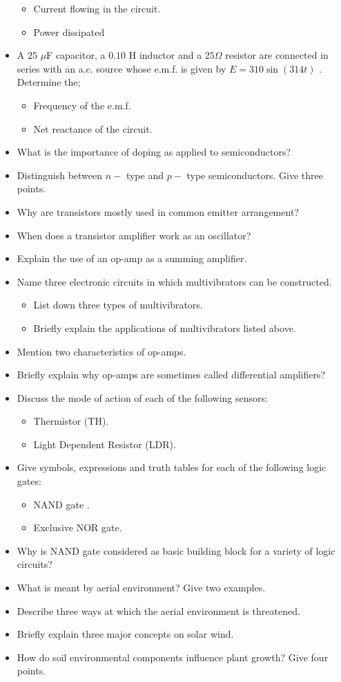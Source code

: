 \documentclass{article}
\begin{document}
\begin{itemize}
 \begin{itemize}
\item Current flowing in the circuit.
\item Power dissipated
\end{itemize}
\item A $ 25$ $\mu$F capacitor, a $ 0.10$ H inductor and a $ 25\Omega $ resistor are connected in series with an a.c. source whose e.m.f. is given by $ E=310 \sin(314t)$ .  Determine the;
 \begin{itemize}
\item Frequency of the e.m.f.
\item Net reactance of the circuit.
\end{itemize}
\item What is the importance of doping as applied to semiconductors?
\item Distinguish between $ n-$ type and $ p-$ type semiconductors.  Give three points.
\item Why are transistors mostly used in common emitter arrangement?
\item When does a transistor amplifier work as an oscillator?
\item Explain the use of an op-amp as a summing amplifier.
\item Name three electronic circuits in which multivibrators can be constructed.
 \begin{itemize}
\item List down three types of multivibrators.
\item Briefly explain the applications of multivibrators listed above.
\end{itemize}
\item Mention two characteristics of op-amps.
\item Briefly explain why op-amps are sometimes called differential amplifiers?
\item Discuss the mode of action of each of the following sensors:
 \begin{itemize}
\item Thermistor (TH).
\item Light Dependent Resistor (LDR).
\end{itemize}
\item Give symbols, expressions and truth tables for each of the following logic gates: 
 \begin{itemize}
\item NAND gate .
\item Exclusive NOR gate.
\end{itemize}
\item Why is NAND gate considered as basic building block for a variety of logic circuits?
\item What is meant by aerial environment?  Give two examples.
\item Describe three ways at which the aerial environment is threatened.
\item Briefly explain three major concepts on solar wind.
\item How do soil environmental components influence plant growth? Give four points.
\end{itemize}
\end{document}
